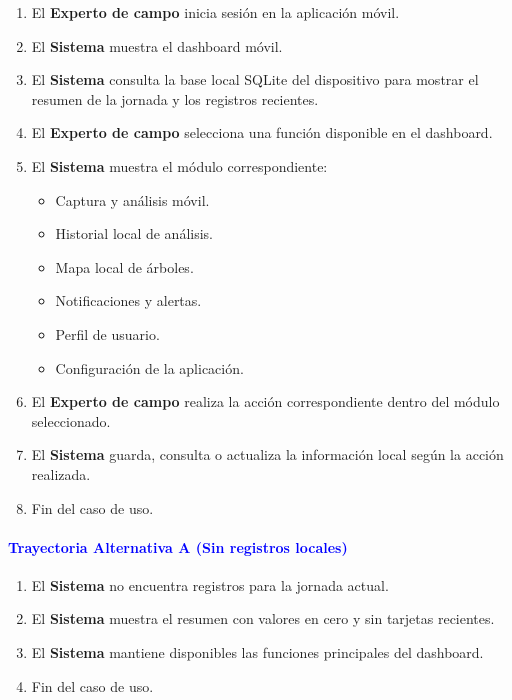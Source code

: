 \begin{enumerate}
    \item El \textbf{Experto de campo} inicia sesión en la aplicación móvil.
    \item El \textbf{Sistema} muestra el dashboard móvil.
    \item El \textbf{Sistema} consulta la base local SQLite del dispositivo para mostrar el resumen de la jornada y los registros recientes.
    \item El \textbf{Experto de campo} selecciona una función disponible en el dashboard.
    \item El \textbf{Sistema} muestra el módulo correspondiente:
    \begin{itemize}
        \item Captura y análisis móvil.
        \item Historial local de análisis.
        \item Mapa local de árboles.
        \item Notificaciones y alertas.
        \item Perfil de usuario.
        \item Configuración de la aplicación.
    \end{itemize}
    \item El \textbf{Experto de campo} realiza la acción correspondiente dentro del módulo seleccionado.
    \item El \textbf{Sistema} guarda, consulta o actualiza la información local según la acción realizada.
    \item Fin del caso de uso.
\end{enumerate}

\paragraph{\textbf{\textcolor{blue}{Trayectoria Alternativa A (Sin registros locales)}}}
\begin{enumerate}
    \item El \textbf{Sistema} no encuentra registros para la jornada actual.
    \item El \textbf{Sistema} muestra el resumen con valores en cero y sin tarjetas recientes.
    \item El \textbf{Sistema} mantiene disponibles las funciones principales del dashboard.
    \item Fin del caso de uso.
\end{enumerate}

